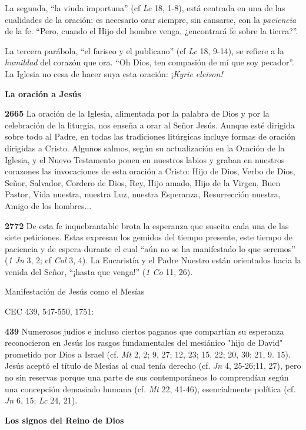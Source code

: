 \documentclass[]{article}
\begin{document}
La segunda, ``la viuda importuna'' (cf \emph{Lc} 18, 1-8), está centrada
en una de las cualidades de la oración: es necesario orar siempre, sin
cansarse, con la \emph{paciencia} de la fe. ``Pero, cuando el Hijo del
hombre venga, ¿encontrará fe sobre la tierra?''.

La tercera parábola, ``el fariseo y el publicano'' (cf \emph{Lc} 18,
9-14), se refiere a la \emph{humildad} del corazón que ora. ``Oh Dios,
ten compasión de mí que soy pecador''. La Iglesia no cesa de hacer suya
esta oración: ¡\emph{Kyrie eleison!}

\textbf{La oración a Jesús}

\textbf{2665} La oración de la Iglesia, alimentada por la palabra de
Dios y por la celebración de la liturgia, nos enseña a orar al Señor
Jesús. Aunque esté dirigida sobre todo al Padre, en todas las
tradiciones litúrgicas incluye formas de oración dirigidas a Cristo.
Algunos salmos, según su actualización en la Oración de la Iglesia, y el
Nuevo Testamento ponen en nuestros labios y graban en nuestros corazones
las invocaciones de esta oración a Cristo: Hijo de Dios, Verbo de Dios,
Señor, Salvador, Cordero de Dios, Rey, Hijo amado, Hijo de la Virgen,
Buen Pastor, Vida nuestra, nuestra Luz, nuestra Esperanza, Resurrección
nuestra, Amigo de los hombres...

\textbf{2772} De esta fe inquebrantable brota la esperanza que suscita
cada una de las siete peticiones. Estas expresan los gemidos del tiempo
presente, este tiempo de paciencia y de espera durante el cual ``aún no
se ha manifestado lo que seremos'' (\emph{1 Jn} 3, 2; cf \emph{Col} 3,
4). La Eucaristía y el Padre Nuestro están orientados hacia la venida
del Señor, ``¡hasta que venga!'' (\emph{1 Co} 11, 26).

Manifestación de Jesús como el Mesías

CEC 439, 547-550, 1751:

\textbf{439} Numerosos judíos e incluso ciertos paganos que compartían
su esperanza reconocieron en Jesús los rasgos fundamentales del
mesiánico "hijo de David" prometido por Dios a Israel (cf. \emph{Mt} 2,
2; 9, 27; 12, 23; 15, 22; 20, 30; 21, 9. 15). Jesús aceptó el título de
Mesías al cual tenía derecho (cf. \emph{Jn} 4, 25-26;11, 27), pero no
sin reservas porque una parte de sus contemporáneos lo comprendían según
una concepción demasiado humana (cf. \emph{Mt} 22, 41-46), esencialmente
política (cf. \emph{Jn} 6, 15; \emph{Lc} 24, 21).

\textbf{Los signos del Reino de Dios}
\end{document}
